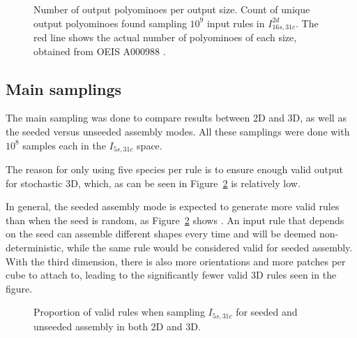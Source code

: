\begin{figure}[h]
    \centering
    \caption{Number of output polyominoes per output size. Count of unique output polyominoes found sampling \(10^9\) input rules in \(I_{16s,31c}^{2d}\). The red line shows the actual number of polyominoes of each size, obtained from OEIS A000988 \cite{sloane1995encyclopedia, oeisA000988}.
    }
    \label{fig:ref_distr}
\end{figure}


\subsection{Main samplings}
\label{sec:maincalc}



The main sampling was done to compare results between 2D and 3D, as well as the seeded versus unseeded assembly modes. All these samplings were done with \(10^8\) samples each in the \(I_{5s,31c}\) space.

The reason for only using five species per rule is to ensure enough valid output for stochastic 3D, which, as can be seen in Figure~\ref{fig:valid_proportion} is relatively low. 

In general, the seeded assembly mode is expected to generate more valid rules than when the seed is random, as Figure~\ref{fig:valid_proportion} shows . An input rule that depends on the seed can assemble different shapes every time and will be deemed non-deterministic, while the same rule would be considered valid for seeded assembly.  With the third dimension, there is also more orientations and more patches per cube to attach to, leading to the significantly fewer valid 3D rules seen in the figure.

\begin{figure}[h]
    \centering
    \caption{Proportion of valid rules when sampling \(I_{5s,31c}\) for seeded and unseeded assembly in both 2D and 3D.}
    \label{fig:valid_proportion}
\end{figure}

